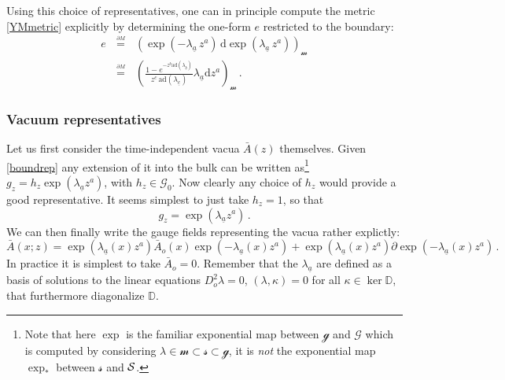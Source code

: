 \documentclass[11pt,a4paper]{article}
\def\calg{{\mathscr G}}
\def\calsg{{\boldsymbol{\mathscr g}}}
\def\calsm{{\boldsymbol{\mathscr m}}}
\def\cals{{\cal S}}
\def\calss{{\boldsymbol{\mathscr s}}}
\def\ua{{\underline{a}}}
\def\ub{{\underline{b}}}
\def\uc{{\underline{c}}}
\def\rd{{\mathrm{d}}}
\def\boundeq{{\stackrel{\ {}_{\partial M_{\,{}_{}}}}{=}}}
\def\Dperp{{\mathbb{D}}}
\def\grad{{\partial}}
\begin{document}
   
   Using this choice of representatives, one can in principle compute the metric \eqref{YMmetric} explicitly by determining the one-form $e$ restricted to the boundary:
   \begin{eqnarray}
   \nonumber   e&\boundeq&\left(\exp(-\lambda_\ua\, z^a)\,\rd\exp(\lambda_\ua\, z^a)\right)_\calsm\\
   &\boundeq&\left(\frac{1-e^{-z^b\mathrm{ad}(\lambda_\ub)}}{z^c\,\mathrm{ad}(\lambda_\uc)}\lambda_\ua\rd z^a\right)_\calsm\,.\label{magicformula}
   \end{eqnarray}
   
   
   
  
  \subsubsection{Vacuum representatives}\label{secvacrep}
  Let us first consider the time-independent vacua $\bar A(z)$ themselves. Given \eqref{boundrep} any extension of it into the bulk can be written as\footnote{ Note that here $\exp$ is the familiar exponential map between $\calsg$ and $\calg$ which is computed by considering $\lambda\in\calsm\subset\calss\subset\calsg$, it is {\it not} the exponential map $\exp_*$ between $\calss$ and $\cals$.} $g_z=h_z \exp(\lambda_\ua z^a)$, with $h_z\in\calg_0$. Now clearly any choice of $h_z$ would provide a good representative. It seems simplest to just take $h_z=1$, so that
  \begin{equation}
  g_z=\exp(\lambda_\ua z^a)\label{bulkrepvac}\,.
  \end{equation}
  We can then finally write the gauge fields representing the vacua rather explictly:
  \begin{equation}
  \bar A(x;z)=\exp(\lambda_\ua(x) z^a)\bar A_o(x) \exp(-\lambda_\ua(x) z^a)+\exp(\lambda_\ua(x) z^a)\grad \exp(-\lambda_\ua(x) z^a)\label{explvac}\,.
  \end{equation}     
  In practice it is simplest to take $\bar A_o=0$. Remember that the $\lambda_\ua$ are defined as a basis of solutions to the linear equations $D_o^2\lambda=0$, $(\lambda,\kappa)=0$ for all $\kappa\in\ker \Dperp$, that furthermore diagonalize $\Dperp$.
  
\end{document}
